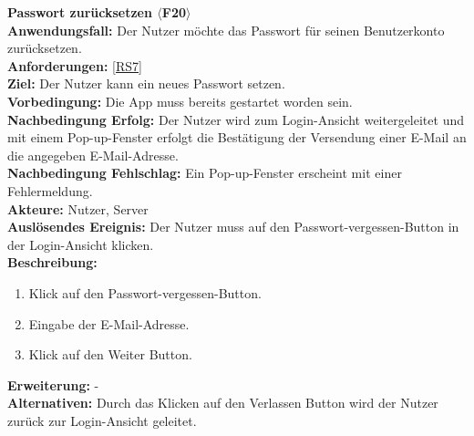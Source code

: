 \documentclass[parskip=full]{scrartcl}
\begin{document}
\textbf{Passwort zurücksetzen $\langle$F20$\rangle$}\\
\textbf{Anwendungsfall:} Der Nutzer möchte das Passwort für seinen Benutzerkonto zurücksetzen.\\
\textbf{Anforderungen:} \ref{RS7}\\
\textbf{Ziel:} Der Nutzer kann ein neues Passwort setzen.\\
\textbf{Vorbedingung:} Die App muss bereits gestartet worden sein.\\
\textbf{Nachbedingung Erfolg:} Der Nutzer wird zum Login-Ansicht weitergeleitet und mit einem Pop-up-Fenster erfolgt die Bestätigung der Versendung einer E-Mail an die angegeben E-Mail-Adresse.\\
\textbf{Nachbedingung Fehlschlag:} Ein Pop-up-Fenster erscheint mit einer Fehlermeldung.\\
\textbf{Akteure:} Nutzer, Server\\
\textbf{Auslösendes Ereignis:} Der Nutzer muss auf den Passwort-vergessen-Button in der Login-Ansicht klicken.\\
\textbf{Beschreibung:}
\begin{enumerate}
    \item Klick auf den Passwort-vergessen-Button.
    \item Eingabe der E-Mail-Adresse.
    \item Klick auf den Weiter Button.
\end{enumerate}
\textbf{Erweiterung:} -\\
\textbf{Alternativen:} Durch das Klicken auf den Verlassen Button wird der Nutzer zurück zur Login-Ansicht geleitet.
\newpage
\end{document}
